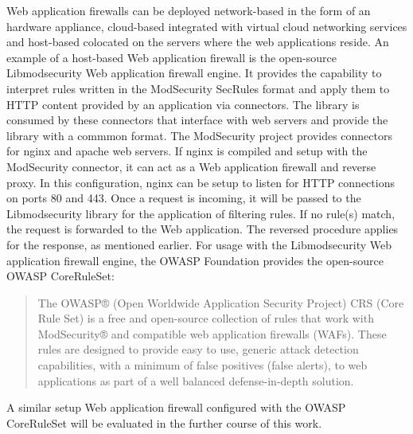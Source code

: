Web application firewalls can be deployed network-based in the form of an hardware appliance, cloud-based integrated with virtual cloud networking services and host-based colocated on the servers where the web applications reside. \cite{palo/waf}
An example of a host-based Web application firewall is the open-source Libmodsecurity Web application firewall engine.
It provides the capability to interpret rules written in the ModSecurity SecRules format and apply them to HTTP content provided by an application via connectors.
The library is consumed by these connectors that interface with web servers and provide the library with a commmon format.
The ModSecurity project provides connectors for nginx and apache web servers.
If nginx is compiled and setup with the ModSecurity connector, it can act as a Web application firewall and reverse proxy. \cite{modsec/home, modsec/nginx}
In this configuration, nginx can be setup to listen for HTTP connections on ports 80 and 443.
Once a request is incoming, it will be passed to the Libmodsecurity library for the application of filtering rules.
If no rule(s) match, the request is forwarded to the Web application. The reversed procedure applies for the response, as mentioned earlier.
For usage with the Libmodsecurity Web application firewall engine, the OWASP Foundation provides the open-source OWASP CoreRuleSet:

\begin{quote}
	The OWASP® (Open Worldwide Application Security Project) CRS (Core Rule Set) is a free and open-source collection of rules that work with ModSecurity® and compatible web application firewalls (WAFs). These rules are designed to provide easy to use, generic attack detection capabilities, with a minimum of false positives (false alerts), to web applications as part of a well balanced defense-in-depth solution. \cite{OWASP/crshome}
\end{quote}

A similar setup Web application firewall configured with the OWASP CoreRuleSet will be evaluated in the further course of this work.
